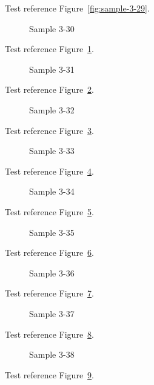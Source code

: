 Test reference Figure~\ref{fig:sample-3-29}.

\begin{figure}[tbhp]
\caption{Sample 3-30}
\label{fig:sample-3-30}
\end{figure}

Test reference Figure~\ref{fig:sample-3-30}.

\begin{figure}[tbhp]
\caption{Sample 3-31}
\label{fig:sample-3-31}
\end{figure}

Test reference Figure~\ref{fig:sample-3-31}.

\begin{figure}[tbhp]
\caption{Sample 3-32}
\label{fig:sample-3-32}
\end{figure}

Test reference Figure~\ref{fig:sample-3-32}.

\begin{figure}[tbhp]
\caption{Sample 3-33}
\label{fig:sample-3-33}
\end{figure}

Test reference Figure~\ref{fig:sample-3-33}.

\begin{figure}[tbhp]
\caption{Sample 3-34}
\label{fig:sample-3-34}
\end{figure}

Test reference Figure~\ref{fig:sample-3-34}.

\begin{figure}[tbhp]
\caption{Sample 3-35}
\label{fig:sample-3-35}
\end{figure}

Test reference Figure~\ref{fig:sample-3-35}.

\begin{figure}[tbhp]
\caption{Sample 3-36}
\label{fig:sample-3-36}
\end{figure}

Test reference Figure~\ref{fig:sample-3-36}.

\begin{figure}[tbhp]
\caption{Sample 3-37}
\label{fig:sample-3-37}
\end{figure}

Test reference Figure~\ref{fig:sample-3-37}.

\begin{figure}[tbhp]
\caption{Sample 3-38}
\label{fig:sample-3-38}
\end{figure}

Test reference Figure~\ref{fig:sample-3-38}.

